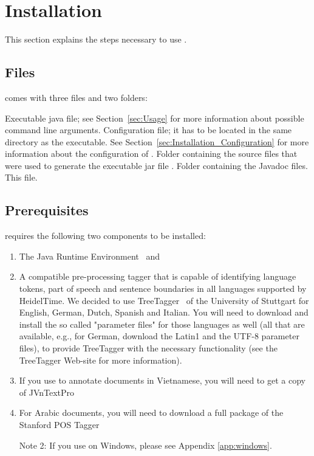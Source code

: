 \section{Installation}\label{sec:Installation}
This section explains the steps necessary to use \product{}.

\subsection{Files}\label{sec:Files}
\product{} comes with three files and two folders:
\begin{itemize}
\itemWithHead{\textnormal{\executableFile}}
Executable java file; see Section~\ref{sec:Usage} for more information about possible command line arguments.
\itemWithHead{\textnormal{\configFile}}
Configuration file; it has to be located in the same directory as the executable. See Section~\ref{sec:Installation_Configuration} for more information about the configuration of \product{}.
Folder containing the source files that were used to generate the executable jar file \executableFile.
Folder containing the Javadoc files.
\itemWithHead{\textnormal{\manualFile}}
This file.

\end{itemize}

\subsection{Prerequisites}\label{sec:Installation_Prerequisites}
\product{} requires the following two components to be installed:
\begin{enumerate}
\item The Java Runtime Environment~\cite{Java} and
\item A compatible pre-processing tagger that is capable of identifying language tokens, part of speech and sentence boundaries in all languages supported by HeidelTime. We decided to use TreeTagger~\cite{TreeTagger} of the University of Stuttgart for English, German, Dutch, Spanish and Italian. You will need to download and install the so called "parameter files" for those languages as well (all that are available, e.g., for German, download the Latin1 and the UTF-8 parameter files), to provide TreeTagger with the necessary functionality (see the TreeTagger Web-site for more information).
\item If you use \product{} to annotate documents in Vietnamese, you will need to get a copy of JVnTextPro~\cite{JVnTextPro}
\item For Arabic documents, you will need to download a full package of the Stanford POS Tagger~\cite{StanfordPOSTagger}

Note 2: If you use \product{} on Windows, please see Appendix \ref{app:windows}.
\end{enumerate}

